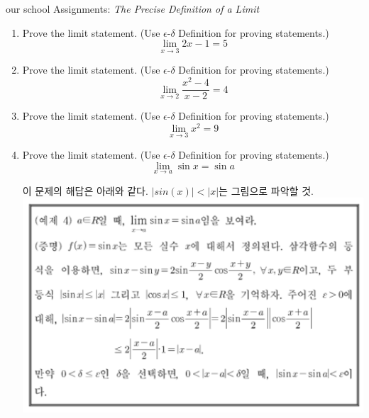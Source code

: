 \documentclass{oblivoir}
\begin{document}
our school Assignments: \emph{The Precise Definition of a Limit}
	\begin{enumerate}
		\item Prove the limit statement. (Use $\epsilon$-$\delta$ Definition for proving statements.)\\
 		\begin{equation}
 			\lim_{x \to 3}{2x-1} = 5 \nonumber
 		\end{equation}
		
		\item Prove the limit statement. (Use $\epsilon$-$\delta$ Definition for proving statements.)\\
 		\begin{equation}
 			\lim_{x \to 2}{\frac{x^2-4}{x-2}} = 4 \nonumber
 		\end{equation}

		\item Prove the limit statement. (Use $\epsilon$-$\delta$ Definition for proving statements.)\\
 		\begin{equation}
 			\lim_{x \to 3}{x^2} = 9 \nonumber
 		\end{equation}
		
		\item Prove the limit statement. (Use $\epsilon$-$\delta$ Definition for proving statements.)\\
 		\begin{equation}
 			\lim_{x \to a}{\sin x} = \sin a \nonumber
 		\end{equation}
		
		이 문제의 해답은 아래와 같다. $|sin(x)| < |x|$는 그림으로 파악할 것. \\
		\includegraphics[width=1.0\textwidth]{solution3.png}
		

\end{enumerate}
\end{document}
